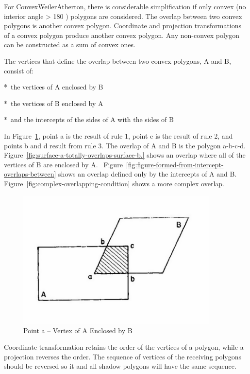 For ConvexWeilerAtherton, there is considerable simplification if only convex (no interior angle \textgreater{} 180 ) polygons are considered. The overlap between two convex polygons is another convex polygon. Coordinate and projection transformations of a convex polygon produce another convex polygon. Any non-convex polygon can be constructed as a sum of convex ones.

The vertices that define the overlap between two convex polygons, A and B, consist of:

*~the vertices of A enclosed by B

*~the vertices of B enclosed by A

*~and the intercepts of the sides of A with the sides of B

In Figure~\ref{fig:point-a-vertex-of-a-enclosed-by-b}, point a is the result of rule 1, point c is the result of rule 2, and points b and d result from rule 3. The overlap of A and B is the polygon a-b-c-d. Figure~\ref{fig:surface-a-totally-overlaps-surface-b.} shows an overlap where all of the vertices of B are enclosed by A.~ Figure~\ref{fig:figure-formed-from-intercept-overlaps-between} shows an overlap defined only by the intercepts of A and B. Figure~\ref{fig:complex-overlapping-condition} shows a more complex overlap.

\begin{figure}[hbtp] %
\centering
\includegraphics[width=0.9\textwidth, height=0.9\textheight, keepaspectratio=true]{media/image637.png}
\caption{  Point a – Vertex of A Enclosed by B \protect \label{fig:point-a-vertex-of-a-enclosed-by-b}}
\end{figure}

Coordinate transformation retains the order of the vertices of a polygon, while a projection reverses the order. The sequence of vertices of the receiving polygons should be reversed so it and all shadow polygons will have the same sequence.


